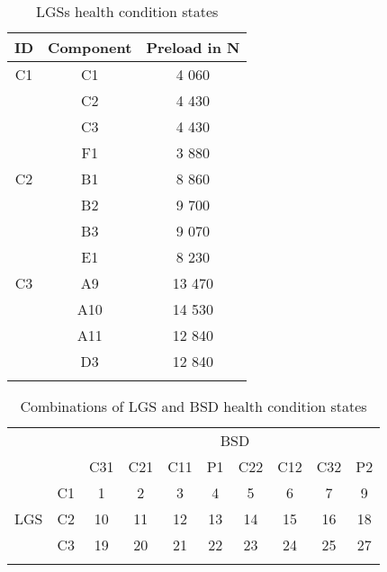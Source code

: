 \begin{center}
\begin{longtable}{c c c} 
\toprule
 ID & Component & Preload in N \\ [0.5ex] 
\midrule
 C1 & C1 & 4 060 \\ 
    & C2 & 4 430 \\ 
    & C3 & 4 430 \\
    & F1 & 3 880 \\ 
\midrule
 C2 & B1 & 8 860 \\ 
    & B2 & 9 700 \\ [1ex] 
    & B3 & 9 070 \\ [1ex]
    & E1 & 8 230 \\ [1ex]
\midrule
 C3 & A9 & 13 470 \\ 
    & A10 & 14 530 \\ [1ex] 
    & A11 & 12 840 \\ [1ex]
    & D3 & 12 840 \\ [1ex]
\bottomrule
\caption {LGSs health condition states}
\label {tab:LGSs_states}
\end{longtable}
\end{center}

\begin{comment}
\begin{center}
\begin{longtable}{c c c c c c c c c c} 
\toprule
&&&&BSD&&&&
\cmidrule(lr){3-11}
  & & C31 & C21 & C11 & P1 & C22 & C12 & C32 & P2  \\ [0.5ex] 
\cmidrule(lr){3-11}
                          & C1 & 1 & 2 & 3 & 4 & 5 & 6 & 7 & 9 \\ 
LGS                       & C2 & 10 & 11 & 12 & 13 & 14 & 15 & 16 & 18  \\ 
                          & C3 & 19 & 20 & 21 & 22 & 23 & 24 & 25 & 27  \\
\bottomrule
\caption {Combinations of LGS and BSD health condition states}
\label {tab:recorded_combinations_of_LGS_and_BSD_health_conditions}
\end{longtable}
\end{center}
\end{comment}






\begin{center}
\begin{longtable}{c c c c c c c c c c} 
\toprule
  &  &    &     &     &     \multicolumn{2}{c}{BSD}     &     &     &    \\ 
  &  & C31 & C21 & C11 & P1  & C22 & C12 & C32 & P2 \\ 
\midrule
     & \multicolumn{1}{c|}{C1} & 1 & 2 & 3 & 4 & 5 & 6 & 7 & 9 \\ 
 LGS & \multicolumn{1}{c|}{C2}& 10 & 11 & 12 & 13 & 14 & 15 & 16 & 18 \\  
     & \multicolumn{1}{c|}{C3} & 19 & 20 & 21 & 22 & 23 & 24 & 25 & 27 \\ 
\bottomrule
\caption {Combinations of LGS and BSD health condition states}
\label {tab:recorded_combinations_of_LGS_and_BSD_health_conditions}
\end{longtable}
\end{center}


